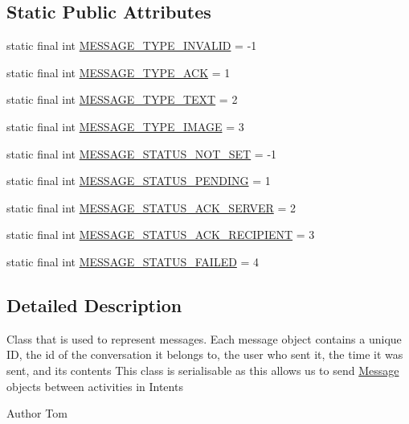 \subsection*{Static Public Attributes}
\begin{DoxyCompactItemize}
\item 
static final int \hyperlink{classcom_1_1lbros_1_1epicchat_1_1_message_a635b4ccc33ba48556636a96b6f1c0c64}{M\-E\-S\-S\-A\-G\-E\-\_\-\-T\-Y\-P\-E\-\_\-\-I\-N\-V\-A\-L\-I\-D} = -\/1
\item 
static final int \hyperlink{classcom_1_1lbros_1_1epicchat_1_1_message_aae10bdd385a5637f52194b35cab6bdac}{M\-E\-S\-S\-A\-G\-E\-\_\-\-T\-Y\-P\-E\-\_\-\-A\-C\-K} = 1
\item 
static final int \hyperlink{classcom_1_1lbros_1_1epicchat_1_1_message_a693c7b51c8566b9f0f96f3bf574cabed}{M\-E\-S\-S\-A\-G\-E\-\_\-\-T\-Y\-P\-E\-\_\-\-T\-E\-X\-T} = 2
\item 
static final int \hyperlink{classcom_1_1lbros_1_1epicchat_1_1_message_acfef13e867b11cda67f3a8d505672a84}{M\-E\-S\-S\-A\-G\-E\-\_\-\-T\-Y\-P\-E\-\_\-\-I\-M\-A\-G\-E} = 3
\item 
static final int \hyperlink{classcom_1_1lbros_1_1epicchat_1_1_message_ab0abf04eb1542a5a19c5ac87b872c6e5}{M\-E\-S\-S\-A\-G\-E\-\_\-\-S\-T\-A\-T\-U\-S\-\_\-\-N\-O\-T\-\_\-\-S\-E\-T} = -\/1
\item 
static final int \hyperlink{classcom_1_1lbros_1_1epicchat_1_1_message_a96104c3d633ceee29fd6beef8ba313aa}{M\-E\-S\-S\-A\-G\-E\-\_\-\-S\-T\-A\-T\-U\-S\-\_\-\-P\-E\-N\-D\-I\-N\-G} = 1
\item 
static final int \hyperlink{classcom_1_1lbros_1_1epicchat_1_1_message_aaedf1504b3466413174c50951b08b0f4}{M\-E\-S\-S\-A\-G\-E\-\_\-\-S\-T\-A\-T\-U\-S\-\_\-\-A\-C\-K\-\_\-\-S\-E\-R\-V\-E\-R} = 2
\item 
static final int \hyperlink{classcom_1_1lbros_1_1epicchat_1_1_message_ae2bf5caf374cd946c0db9ad933da89f9}{M\-E\-S\-S\-A\-G\-E\-\_\-\-S\-T\-A\-T\-U\-S\-\_\-\-A\-C\-K\-\_\-\-R\-E\-C\-I\-P\-I\-E\-N\-T} = 3
\item 
static final int \hyperlink{classcom_1_1lbros_1_1epicchat_1_1_message_a262a6ef24a3fef9601267c6bf5fcd803}{M\-E\-S\-S\-A\-G\-E\-\_\-\-S\-T\-A\-T\-U\-S\-\_\-\-F\-A\-I\-L\-E\-D} = 4
\end{DoxyCompactItemize}


\subsection{Detailed Description}
Class that is used to represent messages. Each message object contains a unique I\-D, the id of the conversation it belongs to, the user who sent it, the time it was sent, and its contents This class is serialisable as this allows us to send \hyperlink{classcom_1_1lbros_1_1epicchat_1_1_message}{Message} objects between activities in Intents \begin{DoxyAuthor}{Author}
Tom 
\end{DoxyAuthor}


